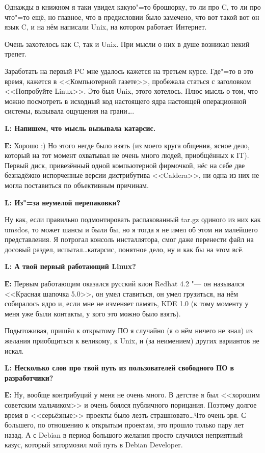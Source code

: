\documentclass[10pt, a5paper]{article}
\begin{document}
Однажды в книжном я таки увидел какую"=то брошюрку, то ли про C, то ли про что"=то ещё, но главное, что в предисловии было замечено, что вот такой вот он язык C, и на нём написали Unix, на котором работает Интернет.

Очень захотелось как C, так и Unix. При мысли о них в душе возникал некий трепет.

Заработать на первый PC мне удалось кажется на третьем курсе. Где"=то в это
время, кажется в <<Компьютерной газете>>, пробежала статься с заголовком <<Попробуйте Linux>>. Это был Unix, этого хотелось. Плюс мысль о том, что
можно посмотреть в исходный код настоящего ядра настоящей операционной
системы, вызывала ощущения на грани\ldots.

{\noindent \bf L: Напишем, что мысль вызывала катарсис.}

{\noindent \bf Е:} Хорошо :) Но этого негде было взять (из моего круга общения, ясное дело, который на
тот момент охватывал не очень много людей, приобщённых к IT). Первый диск, привезённый одной компьютерной фирмочкой, нёс на себе две безнадёжно испорченные версии дистрибутива <<Caldera>>, ни одна из них не могла поставиться
по объективным причинам.

{\noindent \bf L: Из"=за неумелой перепаковки?}

Ну как, если правильно подмонтировать распакованный tar.gz
одиного из них как umsdos, то может шансы и были бы, но я тогда я не имел
об этом ни малейшего представления. Я потрогал консоль инсталлятора,
смог даже перенести файл на досовый раздел, испытал\ldots катарсис, понятное
дело, ну и как бы на этом всё.

{\noindent \bf L: А твой первый работающий Linux?}

{\noindent \bf Е:} Первым работающим оказался русский клон Redhat 4.2 "--- он назывался <<Красная шапочка
5.0>>, он умел ставиться, он умел грузиться, на нём собиралось ядро и, если
мне не изменяет память, KDE 1.0 (к тому моменту у меня уже были контакты,
у кого это можно было взять).

Подытоживая, пришёл к открытому ПО я случайно (я о нём ничего не знал) из
желания приобщиться к великому, к Unix, и (за неимением)  других вариантов не искал.

{\noindent \bf L: Несколько слов про твой путь из пользователей свободного ПО в разработчики?}

{\noindent \bf Е:} Ну, вообще контрибуций у меня не очень много. В детстве я был <<хорошим
советским мальчиком>> и очень боялся публичного порицания. Поэтому долгое
время в <<серьёзные>> проекты было лезть страшновато\ldots Что очень зря. С
большего, по отношению к открытым проектам, это прошло только пару лет
назад. А с Debian в период большого желания просто случился неприятный
казус, который затормозил мой путь в Debian Developer.
\end{document}
